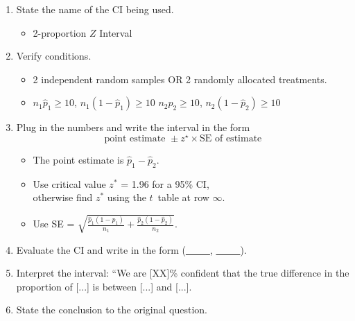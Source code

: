 \begin{termBox}{
\begin{enumerate}
\setlength{\itemsep}{0mm}
\item State the name of the CI being used.\vspace{-1.5mm}
\begin{itemize}
\item 2-proportion $Z$ Interval
\end{itemize}
\item Verify conditions.\vspace{-1.5mm}
\begin{itemize}
\item 2 independent random samples OR 2 randomly allocated treatments.
\item $n_1\hat{p}_1\geq10$, $n_1(1-\hat{p}_1)\geq10$  \newline $n_2\hat{p}_2\geq10$, $n_2(1-\hat{p}_2)\geq10$
\end{itemize}
\item Plug in the numbers and write the interval in the form
$$\text{point estimate } \pm z^\star \times \text{SE of estimate}$$
\begin{itemize}
\item The point estimate is $\hat{p}_1-\hat{p}_2$.
\item Use critical value $z^*$ = 1.96 for a 95\% CI,\\
	otherwise find $z^*$ using the $t$~table at row $\infty$.
\item Use SE = $\sqrt{\frac{\hat{p}_1(1-\hat{p}_1)}{n_1} + \frac{\hat{p}_2(1-\hat{p}_2)}{n_2}}$.
\end{itemize}
\item Evaluate the CI and write in the form (\underline{\ \ \ \ \ }, \underline{\ \ \ \ \ }).
\item Interpret the interval: ``We are [XX]\% confident that the true difference in the proportion of [...] is between [...] and [...].
\item State the conclusion to the original question.
\end{enumerate}}
\end{termBox}

